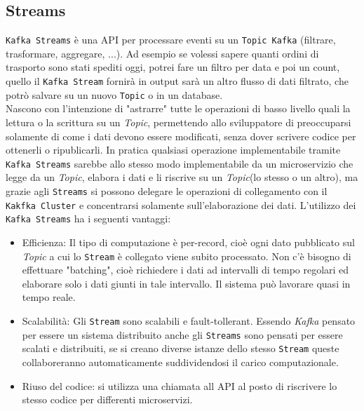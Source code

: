 \subsection{Streams}
\label{subsec:kafka_streams}
\texttt{Kafka Streams} è una API per processare eventi su un \texttt{Topic Kafka} (filtrare, trasformare, aggregare, ...).
Ad esempio se volessi sapere quanti ordini di trasporto sono stati spediti oggi, potrei fare un filtro per data e poi un count, quello il \texttt{Kafka Stream} fornirà in output sarà un altro flusso di dati filtrato, che potrò salvare su un nuovo \texttt{Topic} o in un database.\\
Nascono con l'intenzione di "astrarre" tutte le operazioni di basso livello quali la lettura o la scrittura su un \textit{Topic}, permettendo allo sviluppatore di preoccuparsi solamente di come i dati devono essere modificati, senza dover scrivere codice per ottenerli o ripublicarli.
In pratica qualsiasi operazione implementabile tramite \texttt{Kafka Streams} sarebbe allo stesso modo implementabile da un microservizio che legge da un \textit{Topic}, elabora i dati e li riscrive su un \textit{Topic}(lo stesso o un altro), ma grazie agli \texttt{Streams} si possono delegare le operazioni di collegamento con il \texttt{Kakfka Cluster} e concentrarsi solamente sull'elaborazione dei dati.
L'utilizzo dei \texttt{Kafka Streams} ha i seguenti vantaggi:
\begin{itemize}
    \item Efficienza: Il tipo di computazione è per-record, cioè ogni dato pubblicato sul \textit{Topic} a cui lo \texttt{Stream} è collegato viene subito processato. Non c'è bisogno di effettuare "batching", cioè richiedere i dati ad intervalli di tempo regolari ed elaborare solo i dati giunti in tale intervallo. Il sistema può lavorare quasi in tempo reale.  
    \item Scalabilità: Gli \texttt{Stream} sono scalabili e fault-tollerant. Essendo \textit{Kafka} pensato per essere un sistema distribuito anche gli \texttt{Streams} sono pensati per essere scalati e distribuiti, se si creano diverse istanze dello stesso \texttt{Stream} queste collaboreranno automaticamente suddividendosi il carico computazionale.
    \item Riuso del codice: si utilizza una chiamata all API al posto di riscrivere lo stesso codice per differenti microservizi.
\end{itemize}

